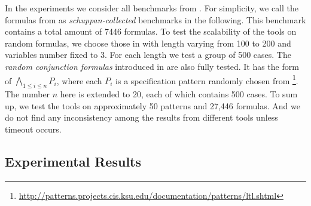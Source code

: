 \documentclass[conference]{IEEEtran}
\begin{document}
In the experiments we consider all benchmarks from
\cite{RV10,SD11,LZPVH13}.
For simplicity, we call the formulas from
\cite{SD11} as \textit{schuppan-collected} benchmarks in the following. This benchmark contains a total amount of 7446 formulas. To test the scalability of the tools on random formulas, we choose those in \cite{RV10} with length varying from 100 to 200 and variables number fixed to 3. For each length we test a group of 500 cases.   The \textit{random conjunction formulas} introduced in \cite{LZPVH13} are also fully tested. It has the form of $\bigwedge_{1\leq i\leq n} P_i$, where each $P_i$ is a specification pattern randomly chosen from \cite{DAC98}\footnote{\url{http://patterns.projects.cis.ksu.edu/documentation/patterns/ltl.shtml}}. The number
$n$ here is extended to 20, each of which contains 500 cases. To sum up, we test the tools on approximately 50 patterns and 27,446 formulas. And we do not find any inconsistency among the results from different tools unless timeout occurs. 

\subsection{Experimental Results}



\iffalse
\begin{figure}[t]
\begin{minipage}[b]{0.45\linewidth}
\centering
\texttt{[image: random]}
\caption{Experimental results on extended random formulas with 3 variables.}
\label{fig:random}
\end{minipage}
\hspace{0.6cm}
\begin{minipage}[b]{0.45\linewidth}
\centering
\texttt{[image: random\_conjunction]}
\caption{Experimental results on random conjunction formulas.}
\label{fig:random_conjunction}
\vspace{0.3cm}
\end{minipage}
\end{figure}
\fi
\end{document}
